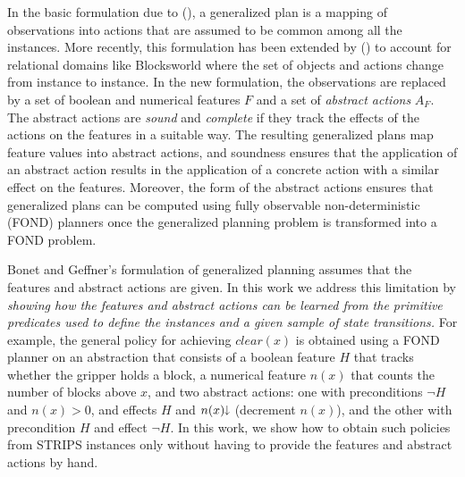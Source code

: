 \documentclass[letterpaper]{article} %
\newcommand{\Omit}[1]{}
\newcommand{\citeay}[1]{\citeauthor{#1} (\citeyear{#1})}
\newcommand{\mminus}{\hspace{-.05em}\raisebox{.15ex}{\footnotesize$\downarrow$}}
\begin{document}
In the basic formulation due  to \citeay{hu:generalized}, a generalized plan
is a mapping of observations into actions that are assumed to be common
among  all the instances. More recently, this formulation has been extended by
\citeay{bonet:ijcai2018} to account for relational domains like Blocksworld  where the set of
objects and  actions change from instance to instance.
In the new formulation, the observations  are replaced by  a set of boolean
and numerical features $F$ and a set of \emph{abstract actions} $A_F$.
The  abstract actions are  \emph{sound} and \emph{complete} if they track the
effects  of the actions on  the features in a suitable way.
The resulting generalized plans  map feature values into abstract actions, and soundness
ensures that the application  of an   abstract action  results in the application of
a concrete action with a similar  effect  on  the features. Moreover, the form of the abstract actions
ensures that generalized plans can be computed using fully observable non-deterministic (FOND) planners
once the generalized planning problem is transformed into a FOND problem.

\Omit{
Abstract actions can increase or decrease numerical variables  $n$
associated with the numerical features (e.g., number of blocks above $x$), and while
increments  are transformed into deterministic propositional  effects $n > 0$ where $n > 0$ is
the negation of the proposition $n=0$, decrements  are  transformed  into
non-deterministic (disjunctive)  propositional effects $n > 0 \, | \, n=0$. 
}

Bonet and Geffner's  formulation of generalized planning assumes that the
features and abstract actions are given. In this work we address this limitation
by  \emph{showing  how the features and abstract actions  can be learned from
the primitive predicates used to define the instances and a given sample of state transitions.}
For example,  the general policy for achieving $clear(x)$ %
is obtained using a FOND planner on an abstraction that consists of  a  boolean
feature $H$  that tracks whether the gripper holds a block,  a numerical feature
$n(x)$ that counts the number of blocks above $x$, and two abstract actions:
one with preconditions $\neg H$ and $n(x) > 0$, and effects $H$ and $n(x)\mminus$
(decrement $n(x)$), and the other with precondition $H$ and effect $\neg H$.
In this work, we show how to obtain such policies from STRIPS instances only
without having to provide the features and abstract actions by hand.
\end{document}
